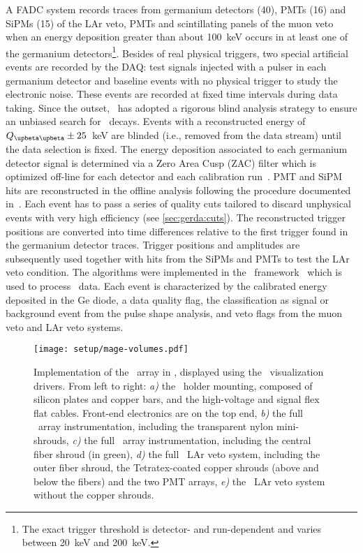 A FADC system records traces from germanium detectors (40), PMTs (16) and SiPMs (15) of
the LAr veto, PMTs and scintillating panels of the muon veto when an energy deposition
greater than about 100~keV occurs in at least one of the germanium detectors\footnote{%
  The exact trigger threshold is detector- and run-dependent and varies between 20~keV and
  200~keV.
}. Besides of real physical triggers, two special artificial events are recorded
by the DAQ: test signals injected with a pulser in each germanium detector and baseline
events with no physical trigger to study the electronic noise. These events are recorded
at fixed time intervals during data taking. Since the outset, \gerda\ has adopted a
rigorous blind analysis strategy to ensure an unbiased search for \onbb\ decays. Events with
a reconstructed energy of $\qbbM \pm 25$~keV are blinded (i.e., removed from
the data stream) until the data selection is fixed.
\newpar
The energy deposition associated to each germanium detector signal is
determined via a Zero Area Cusp (ZAC) filter which is optimized off-line for each detector
and each calibration run~\cite{Agostini2015}. PMT and SiPM hits are reconstructed in the
offline analysis following the procedure documented in~\cite{Agostini2018a}. Each event
has to pass a series of quality cuts tailored to discard unphysical events with very high
efficiency (see \cref{sec:gerda:cuts}). The reconstructed trigger positions are converted
into time differences relative to the first trigger found in the germanium detector
traces. Trigger positions and amplitudes are subsequently used together with hits from the
SiPMs and PMTs to test the LAr veto condition. The algorithms were implemented in the \gelatio\
framework~\cite{Agostini2011} which is used to process \gerda\ data. Each event is
characterized by the calibrated energy deposited in the Ge diode, a data quality flag, the
classification as signal or background event from the pulse shape analysis, and veto flags
from the muon veto and LAr veto systems.

\begin{figure}
  \centering
  \texttt{[image: setup/mage-volumes.pdf]}
  \caption{%
    Implementation of the \gerda\ array in \mage, displayed using the \geant\
    visualization drivers. From left to right: \emph{a)} the \phasetwo\ holder mounting,
    composed of silicon plates and copper bars, and the high-voltage and signal flex flat
    cables.  Front-end electronics are on the top end, \emph{b)} the full \phasetwo\ array
    instrumentation, including the transparent nylon mini-shrouds, \emph{c)} the full
    \phasetwop\ array instrumentation, including the central fiber shroud (in green),
    \emph{d)} the full \phasetwo\ LAr veto system, including the outer fiber shroud, the
    Tetratex\reg-coated copper shrouds (above and below the fibers) and the two PMT
    arrays, \emph{e)} the \phasetwop\ LAr veto system without the copper shrouds.
  }\label{fig:setup:magevolumes}
\end{figure}


